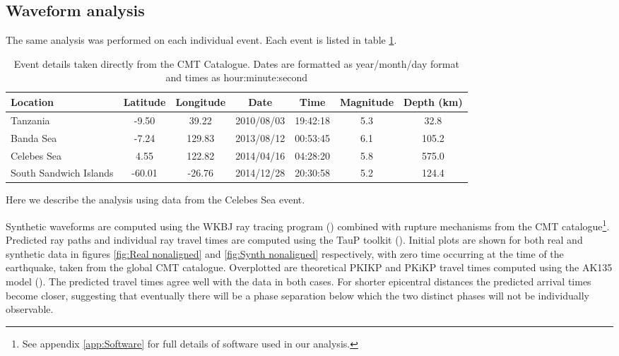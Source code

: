 \documentclass[11pt,a4paper]{article}
\begin{document}
\subsection{Waveform analysis}
\label{sec:Waveforms}
The same analysis was performed on each individual event. Each event is listed in table \ref{tab:Events}.
\begin{table}\footnotesize
\centering
\begin{tabular}{| l | c | c | c | c | c | c |}
	\hline Location				& Latitude		& Longitude	& Date		& Time		& Magnitude	& Depth (km) 	\\ \hline
	\hline Tanzania				& -9.50		& 39.22		& 2010/08/03	& 19:42:18	& 5.3			& 32.8		\\
	\hline Banda Sea			& -7.24		& 129.83		& 2013/08/12	& 00:53:45	& 6.1			& 105.2		\\
	\hline Celebes Sea			& 4.55		& 122.82		& 2014/04/16	& 04:28:20	& 5.8			& 575.0  		\\ 
	\hline South Sandwich Islands 	& -60.01		& -26.76		& 2014/12/28	& 20:30:58	& 5.2			& 124.4		\\
	\hline	
\end{tabular}
\caption{Event details taken directly from the CMT Catalogue. Dates are formatted as year/month/day format and times as hour:minute:second}
\label{tab:Events}
\end{table}
Here we describe the analysis using data from the Celebes Sea event.

Synthetic waveforms are computed using the WKBJ ray tracing program (\cite{Chapman1976}) combined with rupture mechanisms from the CMT catalogue\footnote{See appendix \ref{app:Software} for full details of software used in our analysis.}. Predicted ray paths and individual ray travel times are computed using the TauP toolkit (\cite{Crotwell1999}). Initial plots are shown for both real and synthetic data in figures \ref{fig:Real nonaligned} and \ref{fig:Synth nonaligned} respectively, with zero time occurring at the time of the earthquake, taken from the global CMT catalogue. Overplotted are theoretical PKIKP and PKiKP travel times computed using the AK135 model (\cite{Kennett1995b}). The predicted travel times agree well with the data in both cases.  For shorter epicentral distances the predicted arrival times become closer, suggesting that eventually there will be a phase separation below which the two distinct phases will not be individually observable.
\end{document}
